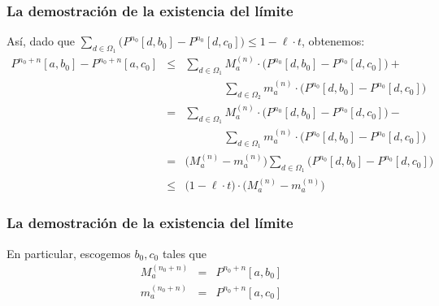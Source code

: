 \begin{frame}
\frametitle{La demostración de la existencia del límite}

{\footnotesize

Así, dado que ${\displaystyle \sum_{d \in \Omega_1} \big(P^{n_0}[d, b_0] - P^{n_0}[d, c_0]\big) \leq 1 - \ell \cdot t}$, obtenemos:
\begin{eqnarray*}
P^{n_0 + n}[a, b_0] - P^{n_0 + n}[a, c_0] & \leq & \sum_{d \in \Omega_1} M_a^{(n)} \cdot \big(P^{n_0}[d, b_0] - P^{n_0}[d, c_0]\big) + \\
&& \hspace{41pt} \sum_{d \in \Omega_2} m_a^{(n)} \cdot \big(P^{n_0}[d, b_0] - P^{n_0}[d, c_0]\big)\\
& = & \sum_{d \in \Omega_1} M_a^{(n)} \cdot \big(P^{n_0}[d, b_0] - P^{n_0}[d, c_0]\big) - \\
&& \hspace{41pt} \sum_{d \in \Omega_1} m_a^{(n)} \cdot \big(P^{n_0}[d, b_0] - P^{n_0}[d, c_0]\big)\\
& = & \big(M_a^{(n)} - m_a^{(n)}\big) \sum_{d \in \Omega_1} \big(P^{n_0}[d, b_0] - P^{n_0}[d, c_0]\big)\\
& \leq & \big(1 - \ell \cdot t\big) \cdot \big(M_a^{(n)} - m_a^{(n)}\big)
\end{eqnarray*}

}

\end{frame}



\begin{frame}
\frametitle{La demostración de la existencia del límite}

{\small

En particular, escogemos $b_0, c_0$ tales que
\begin{eqnarray*}
M_a^{(n_0 + n)} & = & P^{n_0 + n}[a, b_0]\\
m_a^{(n_0 + n)} & = & P^{n_0 + n}[a, c_0]
\end{eqnarray*}



}

\end{frame}